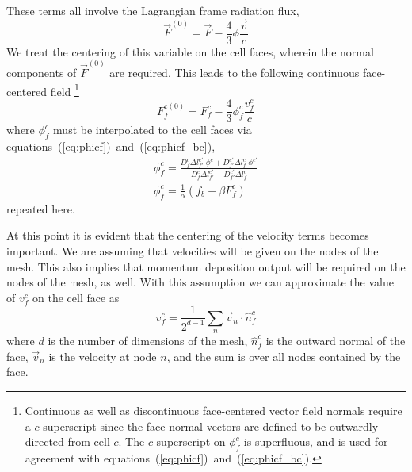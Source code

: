 \documentclass[12pt]{article}
\newcommand{\bfunc}{\ensuremath{f_{b}}}
\begin{document}
These terms all involve the Lagrangian frame radiation flux,
\begin{equation}
        \vec{F}^{(0)} = \vec{F} - \frac{4}{3} \phi \frac{\vec{v}}{c}
\end{equation}
We treat the centering of this variable on the cell faces, wherein the normal
components of $\vec{F}^{(0)}$ are required.
This leads to the following continuous face-centered field%
\footnote{%
   Continuous as well as discontinuous
   face-centered vector field normals require a $c$ superscript
   since the face normal vectors are defined to be outwardly directed from
   cell $c$.
   The $c$ superscript on $\phi^{c}_{f}$ is superfluous, and is used
   for agreement with equations~(\ref{eq:phicf})~and~(\ref{eq:phicf_bc}).
}
\begin{equation}
  \boxed{
        F^{c(0)}_{f} = F^{c}_{f} - \frac{4}{3} \phi^{c}_{f} \frac{v^{c}_{f}}{c}
  }
\end{equation}
where $\phi^{c}_{f}$ must be interpolated to the cell faces
via equations~(\ref{eq:phicf})~and~(\ref{eq:phicf_bc}),
\begin{gather}
   \boxed{
        \phi^{c}_{f} =  \frac
                        { D^{c}_{f} \Delta l^{c'}_{f'} \; \phi^{c} 
                            + D^{c'}_{f'} \Delta l^{c}_{f} \; \phi^{c'} 
                        }
                        { D^{c}_{f} \Delta l^{c'}_{f'}
                            + D^{c'}_{f'} \Delta l^{c}_{f}
                        }
   } \\
   \boxed{
        \phi^{c}_{f} = \frac{1}{\alpha} \left( \bfunc - \beta F^{c}_{f} \right)
   }
\end{gather}
repeated here.

At this point it is evident that the centering of the velocity terms
becomes important.
We are assuming that velocities will be given on the nodes of the mesh.
This also implies that momentum deposition output will be required on
the nodes of the mesh, as well.
With this assumption we can approximate the value of $v^{c}_{f}$
on the cell face as
\begin{equation}
  \boxed{
     v^{c}_{f} = \frac{1}{2^{d-1}} \sum_{n} \vec{v}_{n} \cdot \hat{n}^{c}_{f}
  }
\end{equation}
where $d$ is the number of dimensions of the mesh,
$\hat{n}^{c}_{f}$ is the outward normal of the face,
$\vec{v}_{n}$ is the velocity at node $n$,
and the sum is over all nodes contained by the face.
\end{document}
